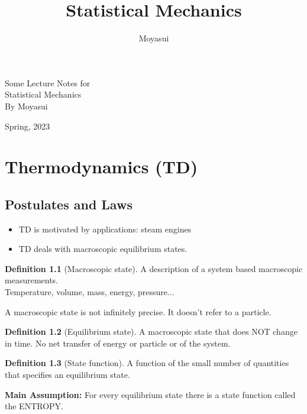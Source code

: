 \documentclass[11pt]{book}
\theoremstyle{definition}
\newtheorem{defn}{Definition}[section]
\providecommand{\HUGE}{\Huge}%
\newlength{\drop}%
\newcommand*{\FSfont}[1]{\fontencoding{T1}\fontfamily{#1}\selectfont}
\newcommand*{\titlePP}{\begingroup%
\drop=0.1\textheight
\vspace*{\drop}
\begin{raggedleft}
{Some Lecture Notes for}\\[1.1\baselineskip]
{\bsifamily \HUGE Statistical Mechanics}\\[\baselineskip]
\FSfont{cmr}
{\Large By Moyasui}\par
\end{raggedleft}
\vfill
\begin{center}
\FSfont{cmr}
{\large Spring, 2023}
\end{center}
\vspace*{\drop}
\endgroup}
\begin{document}
\pagestyle{empty}
\titlePP
\title{Statistical Mechanics}
\author{Moyasui}

\tableofcontents
\chapter{Thermodynamics (TD)}
\section{Postulates and Laws}

\begin{itemize}
	\item TD is motivated by applications: steam engines
	\item TD deals with macroscopic equilibrium states.
\end{itemize}

\begin{defn}[Macroscopic state]
	A description of a system based macroscopic measurements. \\
	Temperature, volume, mass, energy, pressure...
\end{defn}
A macroscopic state is not infinitely precise. It doesn't refer to a particle.

\begin{defn}[Equilibrium state]
	A macroscopic state that does NOT change in time. No net transfer of energy or particle or of the system.
\end{defn}

\begin{defn}[State function]
	A function of the small number of quantities that specifies an equilibrium state.
	
\end{defn}

\textbf{Main Assumption:} 
	For every equilibrium state there is a state function called the ENTROPY.
\end{document}
